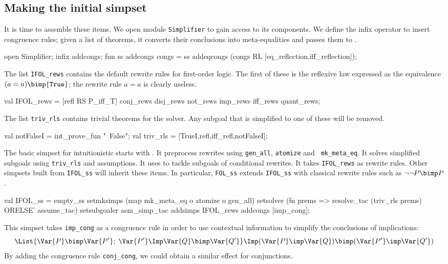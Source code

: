 \subsection{Making the initial simpset}
It is time to assemble these items.  We open module {\tt Simplifier} to
gain access to its components.  We define the infix operator
 to insert congruence rules; given a list of theorems,
it converts their conclusions into meta-equalities and passes them to
.
\begin{ttbox}
open Simplifier;
\ttbreak
infix addcongs;
fun ss addcongs congs =
    ss addeqcongs (congs RL [eq_reflection,iff_reflection]);
\end{ttbox}
The list {\tt IFOL_rews} contains the default rewrite rules for first-order
logic.  The first of these is the reflexive law expressed as the
equivalence $(a=a)\bimp{\tt True}$; the rewrite rule $a=a$ is clearly useless.
\begin{ttbox}
val IFOL_rews =
   [refl RS P_iff_T] \at conj_rews \at disj_rews \at not_rews \at 
    imp_rews \at iff_rews \at quant_rews;
\end{ttbox}
The list {\tt triv_rls} contains trivial theorems for the solver.  Any
subgoal that is simplified to one of these will be removed.
\begin{ttbox}
val notFalseI = int_prove_fun "~False";
val triv_rls = [TrueI,refl,iff_refl,notFalseI];
\end{ttbox}
%
The basic simpset for intuitionistic \FOL{} starts with .
It preprocess rewrites using {\tt gen_all}, {\tt atomize} and {\tt
  mk_meta_eq}.  It solves simplified subgoals using {\tt triv_rls} and
assumptions.  It uses  to tackle subgoals of
conditional rewrites.  It takes {\tt IFOL_rews} as rewrite rules.  
Other simpsets built from {\tt IFOL_ss} will inherit these items.
In particular, {\tt FOL_ss} extends {\tt IFOL_ss} with classical rewrite
rules such as $\neg\neg P\bimp P$.
\begin{ttbox}
val IFOL_ss = 
  empty_ss 
  setmksimps (map mk_meta_eq o atomize o gen_all)
  setsolver  (fn prems => resolve_tac (triv_rls \at prems) ORELSE' 
                          assume_tac)
  setsubgoaler asm_simp_tac
  addsimps IFOL_rews
  addcongs [imp_cong];
\end{ttbox}
This simpset takes {\tt imp_cong} as a congruence rule in order to use
contextual information to simplify the conclusions of implications:
\[ \List{\Var{P}\bimp\Var{P'};\; \Var{P'} \Imp \Var{Q}\bimp\Var{Q'}} \Imp
   (\Var{P}\imp\Var{Q}) \bimp (\Var{P'}\imp\Var{Q'})
\]
By adding the congruence rule {\tt conj_cong}, we could obtain a similar
effect for conjunctions.


